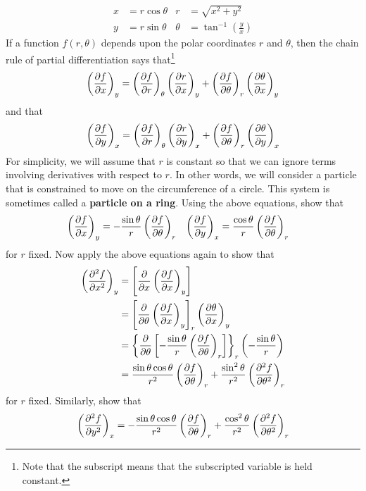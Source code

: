 \documentclass[../notes.tex]{subfiles}
\begin{document}
\begin{enumerate}[label={\textbf{5-\arabic*.}},ref={5-\arabic*}]
\begin{align*}
        x &= r\cos\theta&
            r &= \sqrt{x^2+y^2}\\
        y &= r\sin\theta&
            \theta &= \tan^{-1}\left( \frac{y}{x} \right)
    \end{align*}
    If a function $f(r,\theta)$ depends upon the polar coordinates $r$ and $\theta$, then the chain rule of partial differentiation says that\footnote{Note that the subscript means that the subscripted variable is held constant.}
    \begin{equation*}
        \left( \pdv{f}{x} \right)_y = \left( \pdv{f}{r} \right)_\theta\left( \pdv{r}{x} \right)_y+\left( \pdv{f}{\theta} \right)_r\left( \pdv{\theta}{x} \right)_y
    \end{equation*}
    and that
    \begin{equation*}
        \left( \pdv{f}{y} \right)_x = \left( \pdv{f}{r} \right)_\theta\left( \pdv{r}{y} \right)_x+\left( \pdv{f}{\theta} \right)_r\left( \pdv{\theta}{y} \right)_x
    \end{equation*}
    For simplicity, we will assume that $r$ is constant so that we can ignore terms involving derivatives with respect to $r$. In other words, we will consider a particle that is constrained to move on the circumference of a circle. This system is sometimes called a \textbf{particle on a ring}. Using the above equations, show that
    \begin{align*}
        \left( \pdv{f}{x} \right)_y &= -\frac{\sin\theta}{r}\left( \pdv{f}{\theta} \right)_r&
        \left( \pdv{f}{y} \right)_x &= \frac{\cos\theta}{r}\left( \pdv{f}{\theta} \right)_r
    \end{align*}
    for $r$ fixed. Now apply the above equations again to show that
    \begin{align*}
        \left( \pdv[2]{f}{x} \right)_y &= \left[ \pdv{x}\left( \pdv{f}{x} \right)_y \right]\\
        &= \left[ \pdv{\theta}\left( \pdv{f}{x} \right)_y \right]_r\left( \pdv{\theta}{x} \right)_y\\
        &= \left\{ \pdv{\theta}\left[ -\frac{\sin\theta}{r}\left( \pdv{f}{\theta} \right)_r \right] \right\}_r\left( -\frac{\sin\theta}{r} \right)\\
        &= \frac{\sin\theta\cos\theta}{r^2}\left( \pdv{f}{\theta} \right)_r+\frac{\sin^2\theta}{r^2}\left( \pdv[2]{f}{\theta} \right)_r
    \end{align*}
    for $r$ fixed. Similarly, show that
    \begin{equation*}
        \left( \pdv[2]{f}{y} \right)_x = -\frac{\sin\theta\cos\theta}{r^2}\left( \pdv{f}{\theta} \right)_r+\frac{\cos^2\theta}{r^2}\left( \pdv[2]{f}{\theta} \right)_r

\end{equation*}
\end{enumerate}
\end{document}
